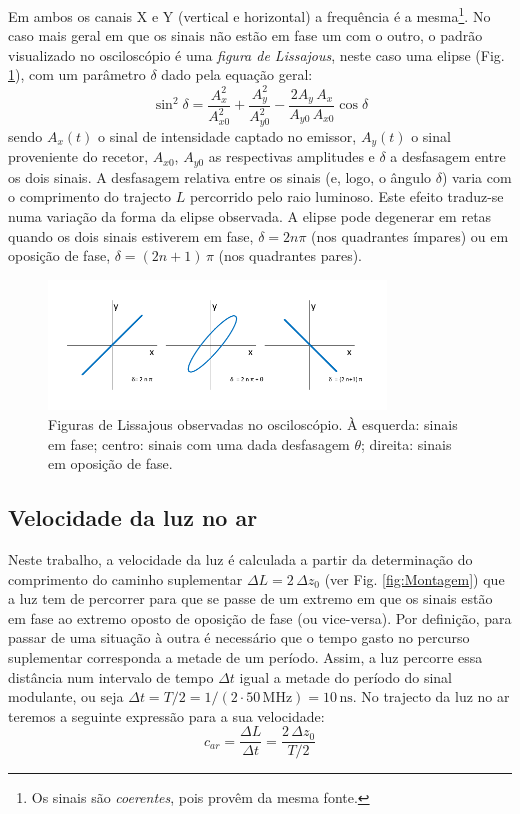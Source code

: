 \documentclass[12pt,a4paper,oneside]{paper}
\begin{document}
Em ambos os canais X e Y (vertical e horizontal) a frequência é a mesma\footnote{Os sinais são \emph{coerentes}, pois provêm da
mesma fonte.}. No caso mais geral em que os sinais não estão em fase um com o outro, o padrão visualizado no osciloscópio é uma
\emph{figura de Lissajous}, neste caso uma elipse (Fig. \ref{fig:fase}), com um parâmetro $\delta$ dado pela equação geral:
\begin{equation}
	\label{eq:elipse}
	\sin^2 \delta = \frac{A_x^2}{A_{x0}^2} + \frac{A_y^2}{A_{y0}^2} - \frac{2 A_y\,A_x}{A_{y0}\,A_{x0}} \cos  \delta
\end{equation}
sendo $A_x(t)$ o sinal de intensidade captado no emissor,  $A_y(t)$ o sinal
proveniente do recetor, $A_{x0}$, $A_{y0}$ as respectivas amplitudes e $\delta$ a desfasagem entre os dois sinais. A desfasagem
relativa entre os sinais (e, logo, o ângulo $\delta$) varia com o comprimento do trajecto $L$ percorrido pelo raio luminoso.
Este efeito traduz-se numa variação da forma da elipse observada.  A elipse pode degenerar em retas quando os dois sinais estiverem
em fase, $\delta = 2n\pi$ (nos quadrantes ímpares)  ou em oposição de fase, $\delta = (2n+1)\,\pi$ (nos quadrantes pares). 

\begin{figure}[H] 
    \centering 
	\includegraphics[width=0.8\textwidth]{./luz_images/osci_fase.pdf}
	\caption{Figuras de Lissajous observadas no osciloscópio. À esquerda: sinais em fase; centro: sinais com uma dada desfasagem
    $\theta$; direita: sinais em oposição de fase.  \label{fig:fase}} 
\end{figure}

\subsection{\sf Velocidade da luz no ar}
Neste trabalho, a velocidade da luz é calculada a partir da determinação do comprimento do
caminho suplementar $\Delta L= 2\,\Delta z_0$ (ver Fig. \ref{fig:Montagem}) que a luz tem de percorrer para que se passe de
um extremo em que os sinais estão em fase ao extremo oposto de oposição de fase (ou vice-versa). Por definição, para passar de
uma situação à outra é necessário que o tempo gasto no percurso suplementar corresponda a metade de um período. Assim, a luz
percorre essa distância num intervalo de tempo $\Delta t$ igual a metade do período do sinal modulante, ou seja
$\Delta t=T/2=1/(2\cdot50\,\textrm{MHz})= 10\,\textrm{ns}$. 
No trajecto da luz no ar teremos a seguinte expressão para a sua velocidade:
\begin{equation}
	\label{eq:vc}
	c_{ar} = \frac{\Delta L}{\Delta t}=\frac{2\,\Delta z_0}{T/2} 
\end{equation}
\end{document}
